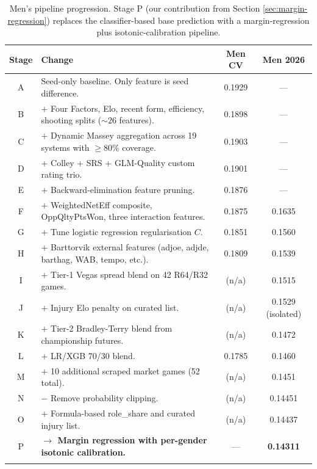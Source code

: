\documentclass[11pt, a4paper]{article}
\begin{document}
\begin{longtable}{@{}c p{9.2cm} c c@{}}
\toprule
\textbf{Stage} & \textbf{Change} & \textbf{Men CV} & \textbf{Men 2026} \\
\midrule
\endhead
A & Seed-only baseline. Only feature is seed difference. & 0.1929 & --- \\
B & $+$ Four Factors, Elo, recent form, efficiency, shooting splits ($\sim\!26$ features). & 0.1898 & --- \\
C & $+$ Dynamic Massey aggregation across 19 systems with $\geq 80\%$ coverage. & 0.1903 & --- \\
D & $+$ Colley $+$ SRS $+$ GLM-Quality custom rating trio. & 0.1901 & --- \\
E & $+$ Backward-elimination feature pruning. & 0.1876 & --- \\
F & $+$ WeightedNetEff composite, OppQltyPtsWon, three interaction features. & 0.1875 & 0.1635 \\
G & $+$ Tune logistic regression regularisation $C$. & 0.1851 & 0.1560 \\
H & $+$ Barttorvik external features (adjoe, adjde, barthag, WAB, tempo, etc.). & 0.1809 & 0.1539 \\
I & $+$ Tier-1 Vegas spread blend on 42 R64/R32 games. & (n/a) & 0.1515 \\
J & $+$ Injury Elo penalty on curated list. & (n/a) & 0.1529 (isolated) \\
K & $+$ Tier-2 Bradley-Terry blend from championship futures. & (n/a) & 0.1472 \\
L & $+$ LR/XGB 70/30 blend. & 0.1785 & 0.1460 \\
M & $+$ 10 additional scraped market games (52 total). & (n/a) & 0.1451 \\
N & $-$ Remove probability clipping. & (n/a) & 0.14451 \\
O & $+$ Formula-based role\_share and curated injury list. & (n/a) & 0.14437 \\
P & \textbf{$\to$ Margin regression with per-gender isotonic calibration.} & --- & \textbf{0.14311} \\
\bottomrule
\caption{Men's pipeline progression. Stage P (our contribution from Section \ref{sec:margin-regression}) replaces the classifier-based base prediction with a margin-regression plus isotonic-calibration pipeline.}
\label{tab:progression}
\end{longtable}
\end{document}
